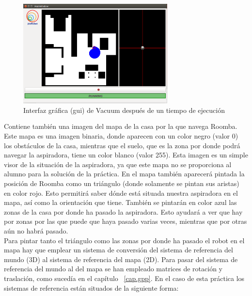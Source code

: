 \begin{figure}[H]
  \begin{center}
    \includegraphics[width=0.7\textwidth]{figures/Vacuum/GUI2.png}
		\caption{Interfaz gráfica (\acrshort{gui}) de Vacuum después de un tiempo de ejecución}
		\label{fig.GUI2}
		\end{center}
\end{figure}

Contiene también una imagen del mapa de la casa por la que navega Roomba. Este mapa es una imagen binaria, donde aparecen con un color negro (valor 0) los obstáculos de la casa, mientras que el suelo, que es la zona por donde podrá navegar la aspiradora, tiene un color blanco (valor 255). Esta imagen es un simple visor de la situación de la aspiradora, ya que este mapa no se proporciona al alumno para la solución de la práctica. En el mapa también aparecerá pintada la posición de Roomba como un triángulo (donde solamente se pintan sus aristas) en color rojo. Esto permitirá saber dónde está situada nuestra aspiradora en el mapa, así como la orientación que tiene. También se pintarán en color azul las zonas de la casa por donde ha pasado la aspiradora. Esto ayudará a ver que hay por zonas por las que puede que haya pasado varias veces, mientras que por otras aún no habrá pasado.\\

Para pintar tanto el triángulo como las zonas por donde ha pasado el robot en el mapa hay que emplear un sistema de conversión del sistema de referencia del mundo (3D) al sistema de referencia del mapa (2D). Para pasar del sistema de referencia del mundo al del mapa se han empleado matrices de rotación y traslación, como sucedía en el capítulo ~\ref{cap.gpp}. En el caso de esta práctica los sistemas de referencia están situados de la siguiente forma:

